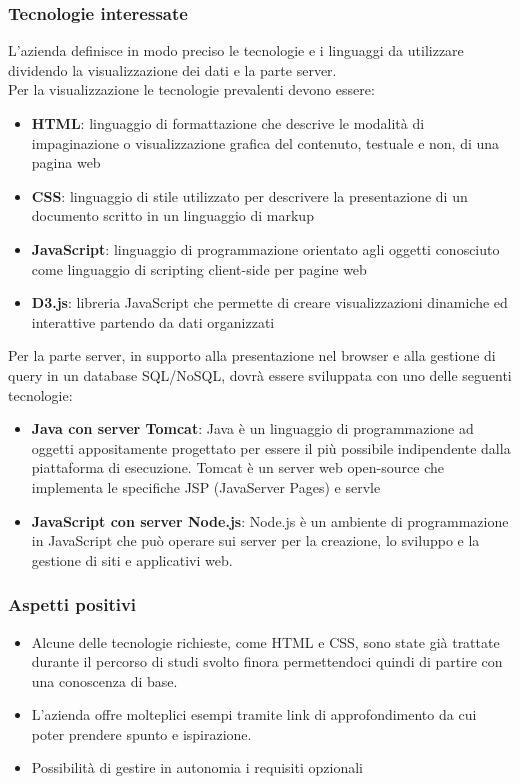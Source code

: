 		\subsubsection{Tecnologie interessate}
			L’azienda definisce in modo preciso le tecnologie e i linguaggi da utilizzare dividendo la visualizzazione dei dati e la parte server.\\
			Per la visualizzazione le tecnologie prevalenti devono essere:\\
			\begin{itemize}
				\item\textbf{HTML}:  linguaggio di formattazione che descrive le modalità di impaginazione o visualizzazione grafica del contenuto, testuale e non, di una pagina web
				\item\textbf{CSS}: linguaggio di stile utilizzato per descrivere la presentazione di un documento scritto in un linguaggio di markup
				\item\textbf{JavaScript}:  linguaggio di programmazione orientato agli oggetti conosciuto come linguaggio di scripting client-side per pagine web
				\item\textbf{D3.js}:  libreria JavaScript che permette di creare visualizzazioni dinamiche ed interattive partendo da dati organizzati
			\end{itemize}
			Per la parte server, in supporto alla presentazione nel browser e alla gestione di query in un database SQL/NoSQL, dovrà essere sviluppata con uno delle seguenti tecnologie:
			\begin{itemize}
				\item\textbf{Java con server Tomcat}: Java è un linguaggio di programmazione ad oggetti appositamente progettato per essere il più possibile indipendente dalla piattaforma di esecuzione. Tomcat è un server web open-source che implementa le specifiche JSP (JavaServer Pages) e servle
				\item\textbf{JavaScript con server Node.js}: Node.js è un ambiente di programmazione in JavaScript che può operare sui server per la creazione, lo sviluppo e la gestione di siti e applicativi web.
			\end{itemize}

			
		\subsubsection{Aspetti positivi}
			\begin{itemize}
				\item Alcune delle tecnologie richieste, come HTML e CSS, sono state già trattate durante il percorso di studi svolto finora permettendoci quindi di partire con una conoscenza di base.
				\item L’azienda offre molteplici esempi tramite link di approfondimento da cui poter 	prendere spunto e ispirazione.
				\item Possibilità di gestire in autonomia i requisiti opzionali
 			\end{itemize}
			
